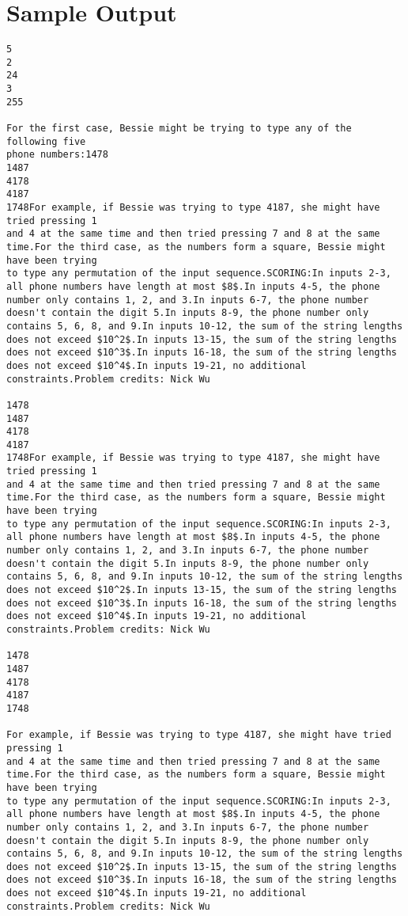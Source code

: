 \documentclass[12pt]{article}
\begin{document}
\section*{Sample Output}
\begin{verbatim}
5
2
24
3
255

For the first case, Bessie might be trying to type any of the following five
phone numbers:1478
1487
4178
4187
1748For example, if Bessie was trying to type 4187, she might have tried pressing 1
and 4 at the same time and then tried pressing 7 and 8 at the same time.For the third case, as the numbers form a square, Bessie might have been trying
to type any permutation of the input sequence.SCORING:In inputs 2-3, all phone numbers have length at most $8$.In inputs 4-5, the phone number only contains 1, 2, and 3.In inputs 6-7, the phone number doesn't contain the digit 5.In inputs 8-9, the phone number only contains 5, 6, 8, and 9.In inputs 10-12, the sum of the string lengths does not exceed $10^2$.In inputs 13-15, the sum of the string lengths does not exceed $10^3$.In inputs 16-18, the sum of the string lengths does not exceed $10^4$.In inputs 19-21, no additional constraints.Problem credits: Nick Wu

1478
1487
4178
4187
1748For example, if Bessie was trying to type 4187, she might have tried pressing 1
and 4 at the same time and then tried pressing 7 and 8 at the same time.For the third case, as the numbers form a square, Bessie might have been trying
to type any permutation of the input sequence.SCORING:In inputs 2-3, all phone numbers have length at most $8$.In inputs 4-5, the phone number only contains 1, 2, and 3.In inputs 6-7, the phone number doesn't contain the digit 5.In inputs 8-9, the phone number only contains 5, 6, 8, and 9.In inputs 10-12, the sum of the string lengths does not exceed $10^2$.In inputs 13-15, the sum of the string lengths does not exceed $10^3$.In inputs 16-18, the sum of the string lengths does not exceed $10^4$.In inputs 19-21, no additional constraints.Problem credits: Nick Wu

1478
1487
4178
4187
1748

For example, if Bessie was trying to type 4187, she might have tried pressing 1
and 4 at the same time and then tried pressing 7 and 8 at the same time.For the third case, as the numbers form a square, Bessie might have been trying
to type any permutation of the input sequence.SCORING:In inputs 2-3, all phone numbers have length at most $8$.In inputs 4-5, the phone number only contains 1, 2, and 3.In inputs 6-7, the phone number doesn't contain the digit 5.In inputs 8-9, the phone number only contains 5, 6, 8, and 9.In inputs 10-12, the sum of the string lengths does not exceed $10^2$.In inputs 13-15, the sum of the string lengths does not exceed $10^3$.In inputs 16-18, the sum of the string lengths does not exceed $10^4$.In inputs 19-21, no additional constraints.Problem credits: Nick Wu


\end{verbatim}
\end{document}
